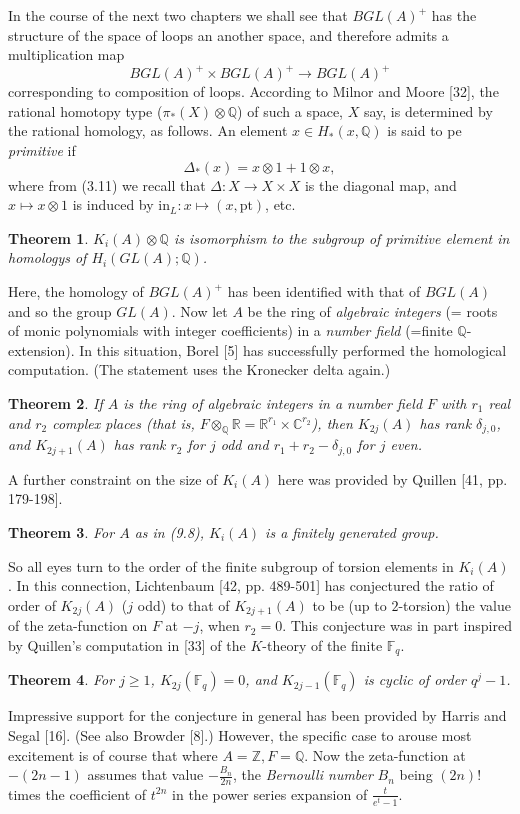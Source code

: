 \documentclass[openany,leqno]{book}  %
\newtheorem{theorem}{Theorem}[chapter]
\begin{document}
In the course of the next two chapters we shall see that $BGL(A)^+$ has the structure of the space of loops an another space, and therefore admits a multiplication map
\[BGL(A)^+ \times BGL(A)^+ \longrightarrow BGL(A)^+ \]
corresponding to composition of loops. According to Milnor and Moore [32], the rational homotopy type ($\pi_*(X)\otimes \mathbb{Q}$) of such a space, $X$ say, is determined by the rational homology, as follows. An element $x\in H_*(x,\mathbb{Q})$ is said to pe {\em primitive} if
\[\Delta_*(x)=x\otimes 1+1\otimes x,\]
where from (3.11) we recall that $\Delta\colon   X \longrightarrow X\times X$ is the diagonal map, and $x\mapsto x\otimes 1$ is induced by $\textrm{in}_L\colon   x\mapsto (x,\textrm{pt})$, etc.\ 
\begin{theorem}
  $K_i(A)\otimes \mathbb{Q}$ is isomorphism to the subgroup of primitive element in homologys of $H_i(GL(A);\mathbb{Q})$.
\end{theorem}
Here, the homology of $BGL(A)^+$ has been identified with that of $BGL(A)$ and so the group $GL(A)$. Now let $A$ be the ring of {\em algebraic integers} (= roots of monic polynomials with integer coefficients) in a {\em number field} (=finite $\mathbb{Q}$-extension). In this situation, Borel [5] has successfully performed the homological computation. (The statement uses the Kronecker delta again.)
\begin{theorem}
  If $A$ is the ring of algebraic integers in a number field $F$ with $r_1$ real and $r_2$ complex places (that is, $F\otimes_{\mathbb{Q}}\mathbb{R}=\mathbb{R}^{r_1}\times \mathbb{C}^{r_2}$), then $K_{2j}(A)$ has rank $\delta_{j,0}$, and $K_{2j+1}(A)$ has rank $r_2$ for $j$ odd and $r_1+r_2-\delta_{j,0}$ for $j$ even.
\end{theorem}
A further constraint on the size of $K_i(A)$ here was provided by Quillen [41, pp. 179-198].
\begin{theorem}
  For $A$ as in (9.8), $K_i(A)$ is a finitely generated group.
\end{theorem}
So all eyes turn to the order of the finite subgroup of torsion elements in $K_i(A)$. In this connection, Lichtenbaum [42, pp. 489-501] has conjectured the ratio of order of $K_{2j}(A)$ ($j$ odd) to that of $K_{2j+1}(A)$ to be (up to $2$-torsion) the value of the zeta-function on $F$ at $-j$, when $r_2 =0$. This conjecture was in part inspired by Quillen's computation in [33] of the $K$-theory of the finite $\mathbb{F}_q$.
\begin{theorem}
  For $j\geqslant 1$, $K_{2j}(\mathbb{F}_q)=0$, and $K_{2j-1}(\mathbb{F}_q)$ is cyclic of order $q^j -1$.
\end{theorem}
Impressive support for the conjecture in general has been provided by Harris and Segal [16]. (See also Browder [8].) However, the specific case to arouse most excitement is of course that where $A=\mathbb{Z}, F=\mathbb{Q}$. Now the zeta-function at $-(2n-1)$ assumes that value $-\frac{B_n}{2n}$, the {\em Bernoulli number} $B_n$ being $(2n)!$ times the coefficient of $t^{2n}$ in the power series expansion of $\frac{t}{e^t-1}$.
\end{document}
